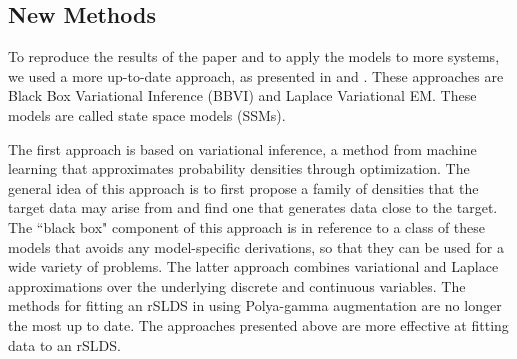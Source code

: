 \subsection{New Methods}

To reproduce the results of the paper and to apply the models to more systems, we used a more up-to-date approach, as presented in \cite{blei_variational_2017} and \cite{zoltowski_unifying_2020}. These approaches are Black Box Variational Inference (BBVI) and Laplace Variational EM. These models are called state space models (SSMs).

The first approach is based on variational inference, a method from machine learning that approximates probability densities through optimization. The general idea of this approach is to first propose a family of densities that the target data may arise from and find one that generates data close to the target. The ``black box" component of this approach is in reference to a class of these models that avoids any model-specific derivations, so that they can be used for a wide variety of problems. The latter approach combines variational and Laplace approximations over the underlying discrete and continuous variables. The methods for fitting an rSLDS in \cite{linderman_bayesian_2017} using Polya-gamma augmentation are no longer the most up to date. The approaches presented above are more effective at fitting data to an rSLDS.

